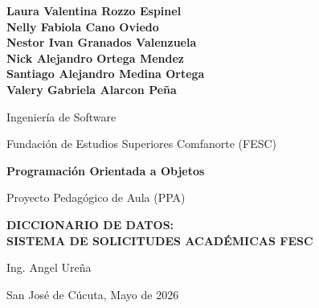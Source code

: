 \documentclass[12pt,letterpaper]{article}
\begin{document}
\begin{titlepage}
    \centering
    \vspace*{0.5in}

    {\normalsize\bfseries
    Laura Valentina Rozzo Espinel\\
    Nelly Fabiola Cano Oviedo\\
    Nestor Ivan Granados Valenzuela\\
    Nick Alejandro Ortega Mendez\\
    Santiago Alejandro Medina Ortega\\
    Valery Gabriela Alarcon Peña
    \par}
    \vspace{0.6in}

    {\normalsize Ingeniería de Software \par}
    \vspace{0.4in}

    {\normalsize Fundación de Estudios Superiores Comfanorte (FESC) \par}
    \vspace{0.6in}

    {\normalsize\bfseries Programación Orientada a Objetos \par}
    \vspace{0.4in}

    {\normalsize Proyecto Pedagógico de Aula (PPA) \par}
    \vspace{0.5in}
    {\normalsize\bfseries DICCIONARIO DE DATOS:\\ SISTEMA DE SOLICITUDES ACADÉMICAS FESC\par}
    \vspace{0.6in}

    {\normalsize Ing. Angel Ureña \par}

    \vfill
    {\normalsize San José de Cúcuta, Mayo de 2026 \par}
\end{titlepage}

\newpage
\tableofcontents

\newpage
{}
\listoftables
\end{document}
